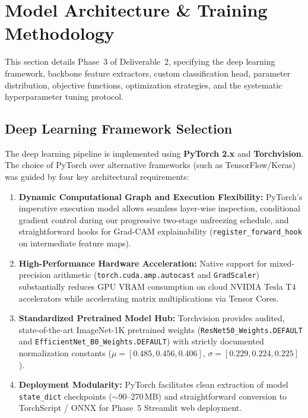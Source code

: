 \section{Model Architecture \& Training Methodology}
\label{sec:model_architecture}

This section details Phase~3 of Deliverable~2, specifying the deep learning framework, backbone feature extractors, custom classification head, parameter distribution, objective functions, optimization strategies, and the systematic hyperparameter tuning protocol.

\subsection{Deep Learning Framework Selection}
\label{subsec:framework}

The deep learning pipeline is implemented using \textbf{PyTorch 2.x} and \textbf{Torchvision}. The choice of PyTorch over alternative frameworks (such as TensorFlow/Keras) was guided by four key architectural requirements:

\begin{enumerate}[leftmargin=*]
    \item \textbf{Dynamic Computational Graph and Execution Flexibility:} PyTorch's imperative execution model allows seamless layer-wise inspection, conditional gradient control during our progressive two-stage unfreezing schedule, and straightforward hooks for Grad-CAM explainability (\texttt{register\_forward\_hook} on intermediate feature maps).
    \item \textbf{High-Performance Hardware Acceleration:} Native support for mixed-precision arithmetic (\texttt{torch.cuda.amp.autocast} and \texttt{GradScaler}) substantially reduces GPU VRAM consumption on cloud NVIDIA Tesla T4 accelerators while accelerating matrix multiplications via Tensor Cores.
    \item \textbf{Standardized Pretrained Model Hub:} Torchvision provides audited, state-of-the-art ImageNet-1K pretrained weights (\texttt{ResNet50\_Weights.DEFAULT} and \texttt{EfficientNet\_B0\_Weights.DEFAULT}) with strictly documented normalization constants (\(\mu = [0.485, 0.456, 0.406]\), \(\sigma = [0.229, 0.224, 0.225]\)).
    \item \textbf{Deployment Modularity:} PyTorch facilitates clean extraction of model \texttt{state\_dict} checkpoints ($\sim$90--270\,MB) and straightforward conversion to TorchScript / ONNX for Phase~5 Streamlit web deployment.
\end{enumerate}

